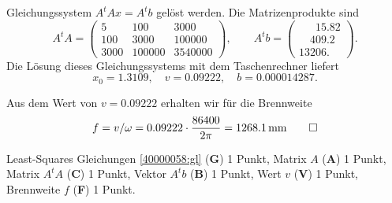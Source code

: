 \begin{loesung}
\begin{teilaufgaben}
Gleichungssystem $A^tAx=A^tb$ gelöst werden.
Die Matrizenprodukte sind
\[
A^tA
=
\begin{pmatrix}
   5&   100&   3000\\
 100&  3000& 100000\\
3000&100000&3540000
\end{pmatrix},
\qquad
A^tb
=
\begin{pmatrix}
\phantom{000}15.82\\
\phantom{00}409.2\phantom{0}\\
13206.\phantom{00}
\end{pmatrix}.
\]
Die Lösung dieses Gleichungssystems mit dem Taschenrechner liefert
\[
x_0 = 1.3109,\quad
v=0.09222,\quad
b=0.000014287.
\]
\item
Aus dem Wert von $v=0.09222$ erhalten wir für die Brennweite
\[
f
=
v/\omega
=
0.09222\cdot \frac{86400}{2\pi}
=
1268.1\, \text{mm}
\qedhere
\]
\end{teilaufgaben}
\end{loesung}


\begin{bewertung}
Least-Squares Gleichungen \eqref{40000058:gl} ({\bf G}) 1 Punkt,
Matrix $A$ ({\bf A}) 1 Punkt,
Matrix $A^tA$ ({\bf C}) 1 Punkt,
Vektor $A^tb$ ({\bf B}) 1 Punkt,
Wert $v$ ({\bf V}) 1 Punkt,
Brennweite $f$ ({\bf F}) 1 Punkt.
\end{bewertung}
